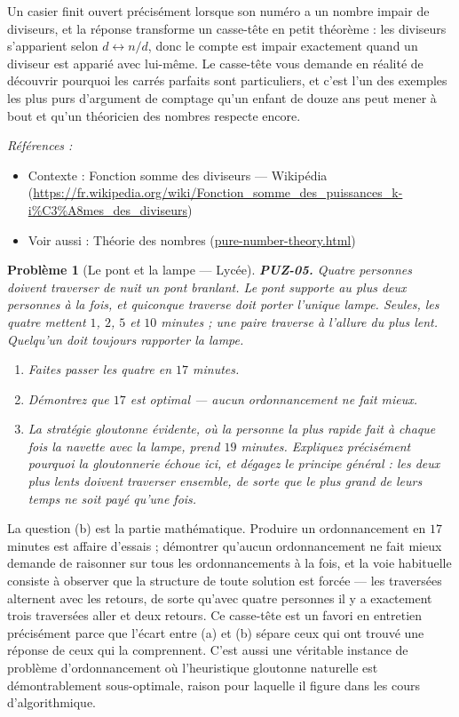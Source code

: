 \documentclass[11pt]{article}
\newtheorem{problem}{Problème}
\newenvironment{refs}{\par\small\noindent\emph{Références :}\begin{itemize}\setlength\itemsep{0pt}}{\end{itemize}\normalsize}
\begin{document}
\noindent Un casier finit ouvert précisément lorsque son numéro a un nombre impair
de diviseurs, et la réponse transforme un casse-tête en petit théorème : les diviseurs
s'apparient selon $ d \leftrightarrow n/d $, donc le compte est impair exactement quand
un diviseur est apparié avec lui-même. Le casse-tête vous demande en réalité de découvrir
pourquoi les carrés parfaits sont particuliers, et c'est l'un des exemples les plus purs
d'argument de comptage qu'un enfant de douze ans peut mener à bout et qu'un théoricien des
nombres respecte encore.

\begin{refs}
\item Contexte : Fonction somme des diviseurs --- Wikipédia (\url{https://fr.wikipedia.org/wiki/Fonction_somme_des_puissances_k-i%C3%A8mes_des_diviseurs})
\item Voir aussi : Théorie des nombres (\url{pure-number-theory.html})
\end{refs}

\bigskip

\begin{problem}[{Le pont et la lampe --- Lycée}]
\textbf{PUZ-05.} Quatre personnes doivent traverser de nuit un pont branlant. Le pont
supporte au plus deux personnes à la fois, et quiconque traverse doit porter l'unique
lampe. Seules, les quatre mettent $ 1 $, $ 2 $, $ 5 $ et $ 10 $ minutes ; une
paire traverse à l'allure du plus lent. Quelqu'un doit toujours rapporter la lampe.
\begin{enumerate}
\item[(a)] Faites passer les quatre en $ 17 $ minutes.
\item[(b)] Démontrez que $ 17 $ est optimal --- aucun ordonnancement ne fait mieux.
\item[(c)] La stratégie gloutonne évidente, où la personne la plus rapide fait à chaque fois la
navette avec la lampe, prend $ 19 $ minutes. Expliquez précisément pourquoi la gloutonnerie
échoue ici, et dégagez le principe général : les deux plus lents doivent traverser ensemble,
de sorte que le plus grand de leurs temps ne soit payé qu'une fois.
\end{enumerate}

\end{problem}

\noindent La question (b) est la partie mathématique. Produire un ordonnancement en
$ 17 $ minutes est affaire d'essais ; démontrer qu'aucun ordonnancement ne fait mieux
demande de raisonner sur tous les ordonnancements à la fois, et la voie habituelle consiste
à observer que la structure de toute solution est forcée --- les traversées alternent avec
les retours, de sorte qu'avec quatre personnes il y a exactement trois traversées aller et
deux retours. Ce casse-tête est un favori en entretien précisément parce que l'écart entre
(a) et (b) sépare ceux qui ont trouvé une réponse de ceux qui la comprennent. C'est aussi
une véritable instance de problème d'ordonnancement où l'heuristique gloutonne naturelle
est démontrablement sous-optimale, raison pour laquelle il figure dans les cours
d'algorithmique.
\end{document}
